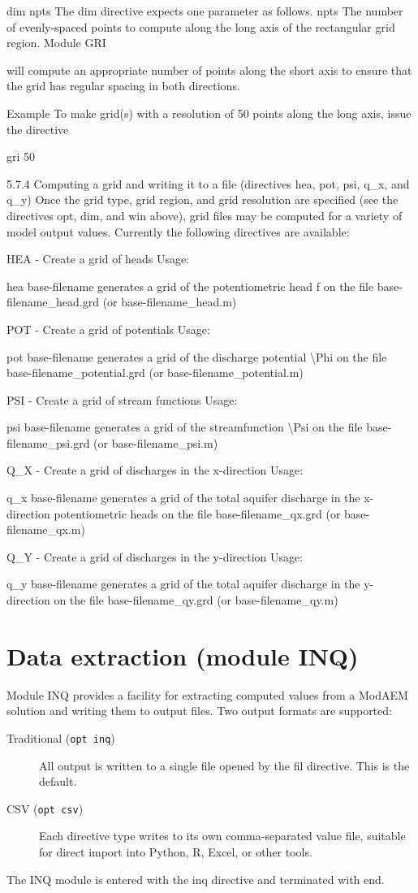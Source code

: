 dim npts The dim directive expects one parameter as follows. npts
The number of evenly-spaced points to compute along the long axis
of the rectangular grid region. Module GRI

will compute an appropriate number of points along the short axis
to ensure that the grid has regular spacing in both directions.

Example To make grid(s) with a resolution of 50 points along the long
axis, issue the directive

gri 50

5.7.4 Computing a grid and writing it to a file (directives hea, pot,
psi, q\_x, and q\_y) Once the grid type, grid region, and grid resolution
are specified (see the directives opt, dim, and win above), grid files
may be computed for a variety of model output values. Currently the
following directives are available:

HEA - Create a grid of heads Usage:

hea base-filename generates a grid of the potentiometric head f on
the file base-filename\_head.grd (or base-filename\_head.m)

POT - Create a grid of potentials Usage:

pot base-filename generates a grid of the discharge potential \textbackslash{}Phi
on the file base-filename\_potential.grd (or base-filename\_potential.m)

PSI - Create a grid of stream functions Usage:

psi base-filename generates a grid of the streamfunction \textbackslash{}Psi
on the file base-filename\_psi.grd (or base-filename\_psi.m)

Q\_X - Create a grid of discharges in the x-direction Usage:

q\_x base-filename generates a grid of the total aquifer discharge
in the x-direction potentiometric heads on the file base-filename\_qx.grd
(or base-filename\_qx.m)

Q\_Y - Create a grid of discharges in the y-direction Usage:

q\_y base-filename generates a grid of the total aquifer discharge
in the y-direction on the file base-filename\_qy.grd (or base-filename\_qy.m)


\section{Data extraction (module INQ)\label{sec:inq-module}}

Module INQ provides a facility for extracting computed values from a ModAEM solution and
writing them to output files. Two output formats are supported:
\begin{description}
\item[{Traditional (\texttt{opt inq})}] All output is written to a single file opened by the
  \textsf{fil} directive. This is the default.
\item[{CSV (\texttt{opt csv})}] Each directive type writes to its own comma-separated value
  file, suitable for direct import into Python, R, Excel, or other tools.
\end{description}
The INQ module is entered with the \textsf{inq} directive and terminated with \textsf{end}.

